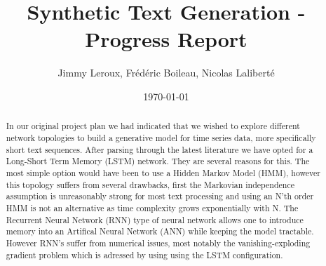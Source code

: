 
\usepackage{titling}
\usepackage{fancyhdr}
\pagestyle{fancy}
\title{Synthetic Text Generation - Progress Report}

\author{Jimmy Leroux, Frédéric Boileau, Nicolas Laliberté }
\date{\today}



\fancyhf{}
\maketitle
\thispagestyle{fancy}

\begin{abstract}
In our original project plan we had indicated that we wished to explore
different network topologies to build a generative model for time series data,
more specifically short text sequences. After parsing through the latest
literature we have opted for a Long-Short Term Memory (LSTM) network. They are
several reasons for this. The most simple option would have been to use a
Hidden Markov Model (HMM), however this topology suffers from several
drawbacks, first the Markovian independence  assumption is unreasonably strong
for most text processing and using an N'th order HMM is not an alternative as
time complexity grows exponentially with N. The Recurrent Neural Network (RNN)
type of neural network allows one to introduce memory into an Artifical Neural
Network (ANN) while keeping the model tractable. However RNN's suffer from
numerical issues, most notably the vanishing-exploding gradient problem which
is adressed by using using the LSTM configuration. \\
\end{abstract}
\clearpage


